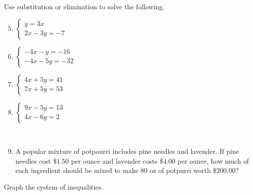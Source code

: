 \documentclass{report}
\theoremstyle{definition}
\begin{document}
\noindent Use substitution or elimination to solve the following.\\

\vspace{-0.5cm}
\begin{minipage}{0.45\linewidth}
	\begin{enumerate}
		\setcounter{enumi}{4}
		\item
			$\begin{cases}
				y=3x\\
				2x-3y=-7
			\end{cases}$
		\vspace{2cm}
		\item
			$\begin{cases}
				-4x-y=-16\\
				-4x-5y=-32
			\end{cases}$
		\vspace{1cm}
	\end{enumerate}
\end{minipage}
\hspace{1cm}
\begin{minipage}{0.45\linewidth}
	\begin{enumerate}
		\setcounter{enumi}{6}
		\item
			$\begin{cases}
				4x+5y=41\\
				7x+5y=53
			\end{cases}$
		\vspace{2cm}
		\item
			$\begin{cases}
				9x-5y=13\\
				4x-6y=2
			\end{cases}$
		\vspace{1cm}
	\end{enumerate}
\end{minipage}\\


\begin{enumerate}
\setcounter{enumi}{8}
\item A popular mixture of potpourri includes pine needles and lavender. If pine needles cost $\$1.50$ per ounce and lavender costs $\$4.00$ per ounce, how much of each ingredient should be mixed to make 80 oz of potpurri worth $\$200.00$?
\end{enumerate}
\vspace{1.5cm}

\noindent Graph the system of inequalities.
\end{document}
